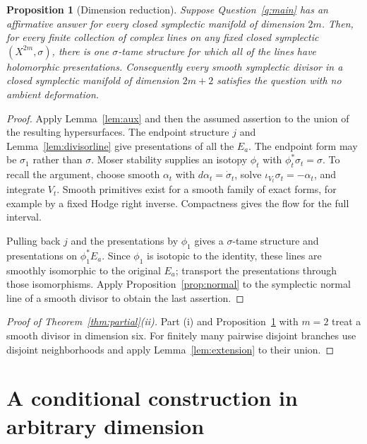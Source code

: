 \documentclass[11pt]{article}
\newtheorem{proposition}[theorem]{Proposition}
\theoremstyle{definition}
\theoremstyle{remark}
\begin{document}

\begin{proposition}[Dimension reduction]\label{prop:reduction}
Suppose Question~\ref{q:main} has an affirmative answer for every closed symplectic manifold of dimension $2m$. Then, for every finite collection of complex lines on any fixed closed symplectic $(X^{2m},\sigma)$, there is one $\sigma$-tame structure for which all of the lines have holomorphic presentations. Consequently every smooth symplectic divisor in a closed symplectic manifold of dimension $2m+2$ satisfies the question with no ambient deformation.
\end{proposition}
\begin{proof}
Apply Lemma~\ref{lem:aux} and then the assumed assertion to the union of the resulting hypersurfaces. The endpoint structure $j$ and Lemma~\ref{lem:divisorline} give presentations of all the $E_a$. The endpoint form may be $\sigma_1$ rather than $\sigma$. Moser stability supplies an isotopy $\phi_t$ with $\phi_t^*\sigma_t=\sigma$. To recall the argument, choose smooth $\alpha_t$ with $d\alpha_t=\dot\sigma_t$, solve $\iota_{V_t}\sigma_t=-\alpha_t$, and integrate $V_t$. Smooth primitives exist for a smooth family of exact forms, for example by a fixed Hodge right inverse. Compactness gives the flow for the full interval.

Pulling back $j$ and the presentations by $\phi_1$ gives a $\sigma$-tame structure and presentations on $\phi_1^*E_a$. Since $\phi_1$ is isotopic to the identity, these lines are smoothly isomorphic to the original $E_a$; transport the presentations through those isomorphisms. Apply Proposition~\ref{prop:normal} to the symplectic normal line of a smooth divisor to obtain the last assertion.
\end{proof}

\begin{proof}[Proof of Theorem~\ref{thm:partial}(ii)]
Part (i) and Proposition~\ref{prop:reduction} with $m=2$ treat a smooth divisor in dimension six. For finitely many pairwise disjoint branches use disjoint neighborhoods and apply Lemma~\ref{lem:extension} to their union.
\end{proof}

\section{A conditional construction in arbitrary dimension}\label{sec:conditional}
\end{document}
